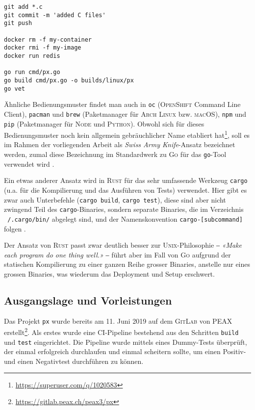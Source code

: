 \begin{lstlisting}[caption={Einie Kommandozeilenbeispiele mit Haupt- und Unterbefehl}]
git add *.c
git commit -m 'added C files'
git push

docker rm -f my-container
docker rmi -f my-image
docker run redis

go run cmd/px.go
go build cmd/px.go -o builds/linux/px
go vet
\end{lstlisting}

Ähnliche Bedienungsmuster findet man auch in \texttt{oc} (\textsc{OpenShift} Command Line Client), \texttt{pacman} und \texttt{brew} (Paketmanager für \textsc{Arch Linux} bzw. \textsc{macOS}), \texttt{npm} und \texttt{pip} (Paketmanager für \textsc{Node} und \textsc{Python}). Obwohl sich für dieses Bedienungsmuster noch kein allgemein gebräuchlicher Name etabliert hat\footnote{\url{https://superuser.com/q/1020583}}, soll es im Rahmen der vorliegenden Arbeit als \textit{Swiss Army Knife}-Ansatz bezeichnet werden, zumal diese Bezeichnung im Standardwerk zu \textsc{Go} für das \texttt{go}-Tool verwendet wird \cite{gopl}.

Ein etwas anderer Ansatz wird in \textsc{Rust} für das sehr umfassende Werkzeug \texttt{cargo} (u.a. für die Kompilierung und das Ausführen von Tests) verwendet. Hier gibt es zwar auch Unterbefehle (\texttt{cargo build}, \texttt{cargo test}), diese sind aber nicht zwingend Teil des \texttt{cargo}-Binaries, sondern separate Binaries, die im Verzeichnis \texttt{~/.cargo/bin/} abgelegt sind, und der Namenskonvention \texttt{cargo-[subcommand]} folgen \cite[Kapitel 14.5]{rust-book}.

Der Ansatz von \textsc{Rust} passt zwar deutlich besser zur \textsc{Unix}-Philosophie ‒ \textit{«Make each program do one thing well.»} \cite[S. 3]{unixtimesharing} ‒ führt aber im Fall von \textsc{Go} aufgrund der statischen Kompilierung zu einer ganzen Reihe grosser Binaries, anstelle nur eines grossen Binaries, was wiederum das Deployment und Setup erschwert.

\subsection{Ausgangslage und Vorleistungen}
\label{sec:ausgangslage}

Das Projekt \texttt{px} wurde bereits am 11. Juni 2019 auf dem \textsc{GitLab} von PEAX erstellt\footnote{\url{https://gitlab.peax.ch/peax3/px}}. Als erstes wurde eine CI-Pipeline bestehend aus den Schritten \texttt{build} und \texttt{test} eingerichtet. Die Pipeline wurde mittels eines Dummy-Tests überprüft, der einmal erfolgreich durchlaufen und einmal scheitern sollte, um einen Positiv- und einen Negativtest durchführen zu können.

